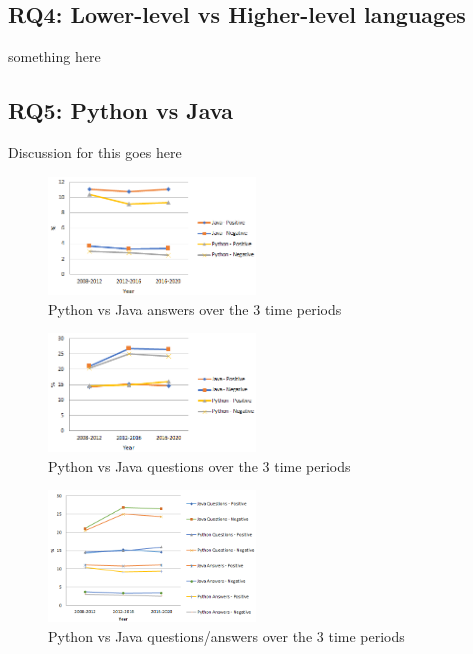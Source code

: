 \documentclass[conference]{IEEEtran}
\begin{document}
\subsection{RQ4: Lower-level vs Higher-level languages}
something here

\subsection{RQ5: Python vs Java}
Discussion for this goes here

\begin{figure}[htbp]
\centerline{\includegraphics[width=0.49\textwidth]{figures/Java-python-answers.png}}
\caption{Python vs Java answers over the 3 time periods}
\label{fig}
\end{figure}

\begin{figure}[htbp]
\centerline{\includegraphics[width=0.49\textwidth]{figures/Java-python-questions.png}}
\caption{Python vs Java questions over the 3 time periods}
\label{fig}
\end{figure}

\begin{figure}[htbp]
\centerline{\includegraphics[width=0.49\textwidth]{figures/Java-python-combined.png}}
\caption{Python vs Java questions/answers over the 3 time periods}
\label{fig}
\end{figure}
\end{document}
